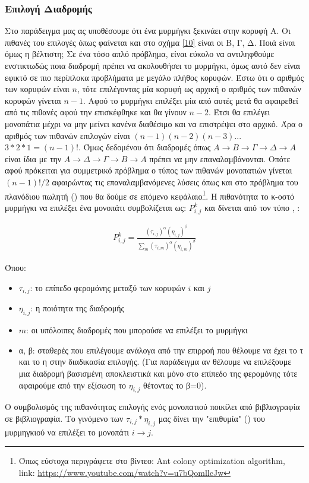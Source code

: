 \subsubsection{Επιλογή Διαδρομής}
\label{3.2.3}
Στο παράδειγμα μας ας υποθέσουμε ότι ένα μυρμήγκι ξεκινάει στην κορυφή Α. Οι πιθανές του επιλογές όπως φαίνεται και στο σχήμα \ref{10} είναι οι Β, Γ, Δ. Ποιά είναι όμως η βέλτιστη; 
Σε ένα τόσο απλό πρόβλημα, είναι εύκολο να αντιληφθούμε ενστικτωδώς ποια διαδρομή πρέπει να ακολουθήσει το μυρμήγκι, όμως αυτό δεν είναι εφικτό σε πιο περίπλοκα προβλήματα με μεγάλο πλήθος κορυφών. Έστω ότι ο αριθμός των κορυφών είναι $n$, τότε επιλέγοντας μία κορυφή ως αρχική ο αριθμός των πιθανών κορυφών γίνεται $n-1$. Αφού το μυρμήγκι επιλέξει μία από αυτές μετά θα αφαιρεθεί από τις πιθανές αφού την επισκέφθηκε και θα γίνουν $n-2$. Έτσι θα επιλέγει μονοπάτια μέχρι να μην μείνει κανένα διαθέσιμο και να επιστρέψει στο αρχικό. Άρα ο αριθμός των πιθανών επιλογών είναι $(n-1)(n-2)(n-3)$...$3*2*1 = (n-1)!$. Όμως δεδομένου ότι διαδρομές όπως $A \rightarrow B \rightarrow Γ \rightarrow Δ \rightarrow A$ είναι ίδια με την $A \rightarrow Δ \rightarrow Γ \rightarrow B \rightarrow A$ πρέπει να μην επαναλαμβάνονται. Οπότε αφού πρόκειται για συμμετρικό πρόβλημα ο τύπος των πιθανών μονοπατιών γίνεται $(n-1)!/2$ αφαιρώντας τις επαναλαμβανόμενες λύσεις όπως και στο πρόβλημα του πλανόδιου πωλητή () που θα δούμε σε επόμενο κεφάλαιο\footnote{Όπως εύστοχα περιγράφετε στο βίντεο: Ant colony optimization algorithm, \\
link: \url{https://www.youtube.com/watch?v=u7bQomllcJw}}.
Η πιθανότητα το κ-οστό μυρμήγκι να επιλέξει ένα μονοπάτι συμβολίζεται ως: $P^k_{i,j}$ και δίνεται από τον τύπο \cite{chandrashekar2023hwacoa}, \cite{blum2005ant}:

\begin{align} \label{eq:3}
	P^k_{i,j}=\frac{(τ_{i,j})^α(η_{i,j})^β}{\sum_{m}(τ_{i,m})^α(η_{i,m})^β}
\end{align}

Όπου: 
\begin{itemize}
    \item $τ_{i,j}$: το επίπεδο φερομόνης μεταξύ των κορυφών $i$ και $j$
    \item $η_{i,j}$: η ποιότητα της διαδρομής
    \item $m$: οι υπόλοιπες διαδρομές που μπορούσε να επιλέξει το μυρμήγκι
    \item α, β: σταθερές που επιλέγουμε ανάλογα από την επιρροή που θέλουμε να έχει το τ και το η στην διαδικασία επιλογής. (Για παράδειγμα αν θέλουμε να επιλέξουμε μια διαδρομή βασισμένη αποκλειστικά και μόνο στο επίπεδο της φερομόνης τότε αφαιρούμε από την εξίσωση το $η_{i,j}$ θέτοντας το β=0).
\end{itemize}
Ο συμβολισμός της πιθανότητας επιλογής ενός μονοπατιού ποικίλει από βιβλιογραφία σε βιβλιογραφία. 
Το γινόμενο των $τ_{i,j}*η_{i,j}$ μας δίνει την "επιθυμία" () του μυρμηγκιού να επιλέξει το μονοπάτι $i \rightarrow j$.

